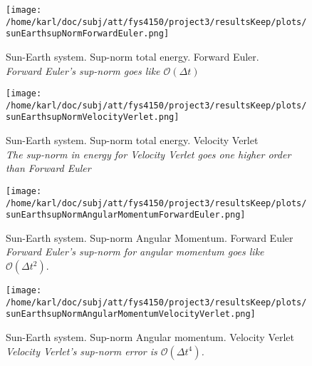 \documentclass{article}
\begin{document}
\begin{minipage}{.49\textwidth} 
	\begin{figure}[H]
		\centering
		\texttt{[image: /home/karl/doc/subj/att/fys4150/project3/resultsKeep/plots/sunEarthsupNormForwardEuler.png]}
		\caption{Sun-Earth system. Sup-norm total energy. Forward Euler. \\ \textit{Forward Euler's sup-norm goes like $\mathcal{O}(\Delta t)$}}
		\label{1}
	\end{figure}
\end{minipage}\hfill
\begin{minipage}{.49\textwidth} 
	\begin{figure}[H]
		\centering
		\texttt{[image: /home/karl/doc/subj/att/fys4150/project3/resultsKeep/plots/sunEarthsupNormVelocityVerlet.png]}
		\caption{Sun-Earth system. Sup-norm total energy. Velocity Verlet \\ \textit{The sup-norm in energy for Velocity Verlet goes one higher order than Forward Euler}}
		\label{1}
	\end{figure}
\end{minipage}\hfill
\vspace{2ex}

\begin{minipage}{.49\textwidth} 
	\begin{figure}[H]
		\centering
		\texttt{[image: /home/karl/doc/subj/att/fys4150/project3/resultsKeep/plots/sunEarthsupNormAngularMomentumForwardEuler.png]}
		\caption{Sun-Earth system. Sup-norm Angular Momentum. Forward Euler \\ \textit{Forward Euler's sup-norm for angular momentum goes like $\mathcal{O}(\Delta t^2)$}.}
		\label{1}
	\end{figure}
\end{minipage}\hfill
\begin{minipage}{.49\textwidth} 
	\begin{figure}[H]
		\centering
		\texttt{[image: /home/karl/doc/subj/att/fys4150/project3/resultsKeep/plots/sunEarthsupNormAngularMomentumVelocityVerlet.png]}
		\caption{Sun-Earth system. Sup-norm Angular momentum. Velocity Verlet \\ \textit{Velocity Verlet's sup-norm error is $\mathcal{O}(\Delta t^4)$.}}
		\label{1}
	\end{figure}
\end{minipage}\hfill
\vspace{2ex}
\end{document}
